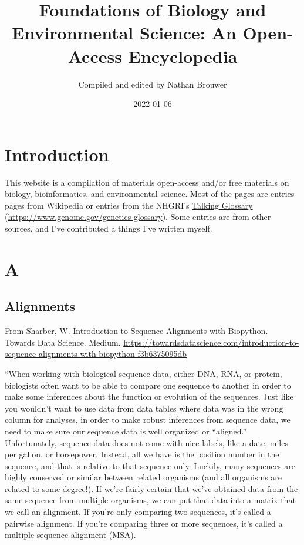 \documentclass[
]{book}
\title{Foundations of Biology and Environmental Science: An Open-Access Encyclopedia}
\author{Compiled and edited by Nathan Brouwer}
\date{2022-01-06}
\begin{document}
\maketitle

{
\setcounter{tocdepth}{1}
\tableofcontents
}
\hypertarget{introduction}{%
\chapter{Introduction}\label{introduction}}

This website is a compilation of materials open-access and/or free materials on biology, bioinformatics, and environmental science. Most of the pages are entries pages from Wikipedia or entries from the NHGRI's \href{https://www.genome.gov/genetics-glossary}{Talking Glossary} (\url{https://www.genome.gov/genetics-glossary}). Some entries are from other sources, and I've contributed a things I've written myself.

\hypertarget{a}{%
\chapter{A}\label{a}}

\hypertarget{alignments}{%
\section{Alignments}\label{alignments}}

From Sharber, W. \href{https://towardsdatascience.com/introduction-to-sequence-alignments-with-biopython-f3b6375095db}{Introduction to Sequence Alignments with Biopython}. Towards Data Science. Medium.
\url{https://towardsdatascience.com/introduction-to-sequence-alignments-with-biopython-f3b6375095db}

``When working with biological sequence data, either DNA, RNA, or protein, biologists often want to be able to compare one sequence to another in order to make some inferences about the function or evolution of the sequences. Just like you wouldn't want to use data from data tables where data was in the wrong column for analyses, in order to make robust inferences from sequence data, we need to make sure our sequence data is well organized or ``aligned.'' Unfortunately, sequence data does not come with nice labels, like a date, miles per gallon, or horsepower. Instead, all we have is the position number in the sequence, and that is relative to that sequence only. Luckily, many sequences are highly conserved or similar between related organisms (and all organisms are related to some degree!). If we're fairly certain that we've obtained data from the same sequence from multiple organisms, we can put that data into a matrix that we call an alignment. If you're only comparing two sequences, it's called a pairwise alignment. If you're comparing three or more sequences, it's called a multiple sequence alignment (MSA).
\end{document}
